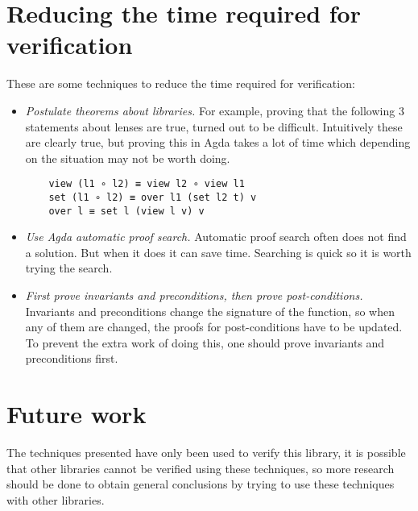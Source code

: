 \section{Reducing the time required for verification} \label{reduce_time}
These are some techniques to reduce the time required for verification:
\begin{itemize}
    \item \textit{Postulate theorems about libraries.} For example, proving that the following 3 statements about lenses are true, turned out to be difficult. Intuitively these are clearly true, but proving this in Agda takes a lot of time which depending on the situation may not be worth doing. 
    \begin{verbatim}
    view (l1 ∘ l2) ≡ view l2 ∘ view l1
    set (l1 ∘ l2) ≡ over l1 (set l2 t) v
    over l ≡ set l (view l v) v
    \end{verbatim}
    \item \textit{Use Agda automatic proof search.} Automatic proof search often does not find a solution. But when it does it can save time. Searching is quick so it is worth trying the search.
    \item \textit{First prove invariants and preconditions, then prove post-conditions.} Invariants and preconditions change the signature of the function, so when any of them are changed, the proofs for post-conditions have to be updated. To prevent the extra work of doing this, one should prove invariants and preconditions first.
\end{itemize}

\section{Future work}
The techniques presented have only been used to verify this library, it is possible that other libraries cannot be verified using these techniques, so more research should be done to obtain general conclusions by trying to use these techniques with other libraries. 

